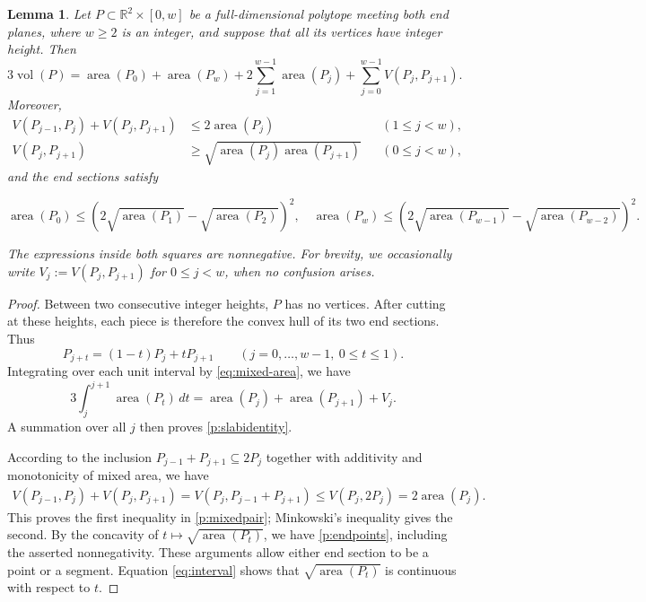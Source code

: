 \documentclass[reqno, 11pt]{article}
\numberwithin{equation}{section}
\newtheorem{lemma}[lemma]{Lemma}
\theoremstyle{definition}
\newcommand{\R}{\mathbb R}
\DeclareMathOperator{\vol}{vol}
\DeclareMathOperator{\area}{area}
\numberwithin{equation}{section}
\begin{document}
\begin{lemma}\label{p:slabs}
Let $P\subset\R^2\times[0,w]$ be a full-dimensional polytope meeting both end planes, where $w\ge2$ is an integer, and suppose
that all its vertices have integer height. Then
\begin{equation}\label{p:slabidentity}
 3\vol(P)=\area(P_0)+\area(P_w)+2\sum_{j=1}^{w-1}\area(P_j)+\sum_{j=0}^{w-1}V(P_j,P_{j+1}).
\end{equation}
Moreover,
\begin{equation}\label{p:mixedpair}
\begin{aligned}
 V(P_{j-1},P_j)+V(P_j,P_{j+1})&\le2\area(P_j) &&(1\le j<w),\\
 V(P_j,P_{j+1})&\ge\sqrt{\area(P_j)\area(P_{j+1})} &&(0\le j<w),
\end{aligned}
\end{equation}
and the end sections satisfy
\begin{small}
\begin{equation}\label{p:endpoints}
\area(P_0)\le\left(2\sqrt{\area(P_1)}-\sqrt{\area(P_2)}\right)^2,\quad 
\area(P_w)\le\left(2\sqrt{\area(P_{w-1})}-\sqrt{\area(P_{w-2})}\right)^2.
\end{equation}
\end{small}
The expressions inside both squares are nonnegative. For brevity, we occasionally write \(V_j:=V(P_j,P_{j+1})\) for \(0\le j<w\), when no confusion arises.
\end{lemma}
\begin{proof}
Between two consecutive integer heights, $P$ has no vertices.
After cutting at these heights, each piece is therefore the convex
hull of its two end sections. Thus
\begin{equation}\label{eq:interval}
P_{j+t}=(1-t)P_j+tP_{j+1}
\qquad(j=0,\ldots,w-1,\ 0\le t\le1).
\end{equation}
Integrating over each unit interval by \eqref{eq:mixed-area}, we have
\[
3\int_j^{j+1}\area(P_t)\,dt
=\area(P_j)+\area(P_{j+1})+V_j.
\]
A summation over all $j$ then proves \eqref{p:slabidentity}.

According to the inclusion $P_{j-1}+P_{j+1}\subseteq2P_j$ together with additivity and monotonicity of mixed area, we have  
\begin{align*}
V(P_{j-1},P_j)+V(P_j,P_{j+1})=V(P_j,P_{j-1}+P_{j+1})\le V(P_j,2P_j)=2\operatorname{area}(P_j).
\end{align*}
This proves the first inequality in \eqref{p:mixedpair}; Minkowski's inequality gives the second.
By the concavity of $t\mapsto\sqrt{\area(P_t)}$, we have \eqref{p:endpoints}, including the asserted nonnegativity. These arguments allow either end section to be a point or a segment. Equation \eqref{eq:interval} shows that $\sqrt{\area(P_t)}$ is continuous with respect to $t$.
\end{proof}
\end{document}
